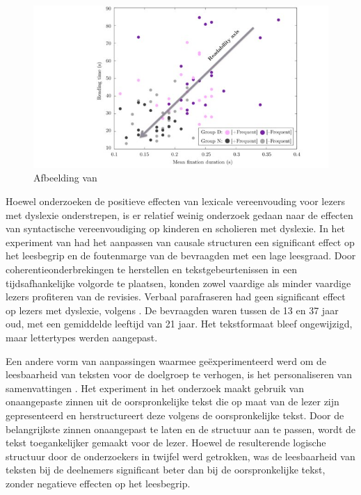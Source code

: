 \medspace

\begin{figure}
\includegraphics[width=\linewidth]{img/readability-mean-fixation-duration.png}
\caption{Afbeelding van \textcite{Rello2013a}}
\label{img:readability-mean-fixation-duration}
\end{figure}

\medspace

Hoewel onderzoeken de positieve effecten van lexicale vereenvouding voor lezers met dyslexie onderstrepen, is er relatief weinig onderzoek gedaan naar de effecten van syntactische vereenvoudiging op kinderen en scholieren met dyslexie. In het experiment van \textcite{Linderholm2000} had het aanpassen van causale structuren een significant effect op het leesbegrip en de foutenmarge van de bevraagden met een lage leesgraad. Door coherentieonderbrekingen te herstellen en tekstgebeurtenissen in een tijdsafhankelijke volgorde te plaatsen, konden zowel vaardige als minder vaardige lezers profiteren van de revisies. Verbaal parafraseren had geen significant effect op lezers met dyslexie, volgens \textcite{Rello2013c}. De bevraagden waren tussen de 13 en 37 jaar oud, met een gemiddelde leeftijd van 21 jaar. Het tekstformaat bleef ongewijzigd, maar lettertypes werden aangepast.

\medspace

Een andere vorm van aanpassingen waarmee geëxperimenteerd werd om de leesbaarheid van teksten voor de doelgroep te verhogen, is het personaliseren van samenvattingen \autocite{Nandhini2013}. Het experiment in het onderzoek maakt gebruik van onaangepaste zinnen uit de oorspronkelijke tekst die op maat van de lezer zijn gepresenteerd en herstructureert deze volgens de oorspronkelijke tekst. Door de belangrijkste zinnen onaangepast te laten en de structuur aan te passen, wordt de tekst toegankelijker gemaakt voor de lezer. Hoewel de resulterende logische structuur door de onderzoekers in twijfel werd getrokken, was de leesbaarheid van teksten bij de deelnemers significant beter dan bij de oorspronkelijke tekst, zonder negatieve effecten op het leesbegrip.

